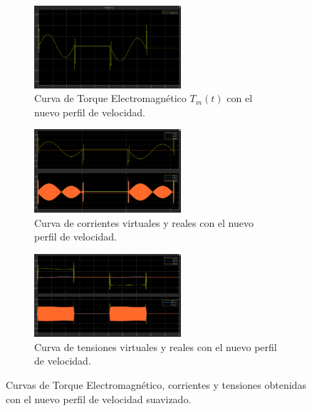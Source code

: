 \documentclass{article}
\begin{document}
\begin{figure}[H]
    \centering
    \begin{subfigure}[t]{\textwidth}
        \centering
        \includegraphics[width=0.6\textwidth]{Imagenes/Torque_electromagnetico_velocidad_trapezoidal.png}
        \caption{Curva de Torque Electromagnético \(T_m(t)\) con el nuevo perfil de velocidad.}
        \label{fig:Torque_electromagnetico_velocidad_trapezoidal}
    \end{subfigure}
    
    \vspace{0.5cm} %
    
    \begin{subfigure}[t]{\textwidth}
        \centering
        \includegraphics[width=0.6\textwidth]{Imagenes/Corrientes_velocidad_trapezoidal.png}
        \caption{Curva de corrientes virtuales y reales con el nuevo perfil de velocidad.}
        \label{fig:Corrientes_velocidad_trapezoidal}
    \end{subfigure}

    \vspace{0.5cm} %
    
    \begin{subfigure}[t]{\textwidth}
        \centering
        \includegraphics[width=0.6\textwidth]{Imagenes/Tensiones_velocidad_trapezoidal.png}
        \caption{Curva de tensiones virtuales y reales con el nuevo perfil de velocidad.}
        \label{fig:Tensiones_velocidad_trapezoidal}
    \end{subfigure}
    \caption{Curvas de Torque Electromagnético, corrientes y tensiones obtenidas con el nuevo perfil de velocidad suavizado.}
    \label{fig:simulacion_perfil_trapezoidal_velocidad}
\end{figure}
\end{document}
